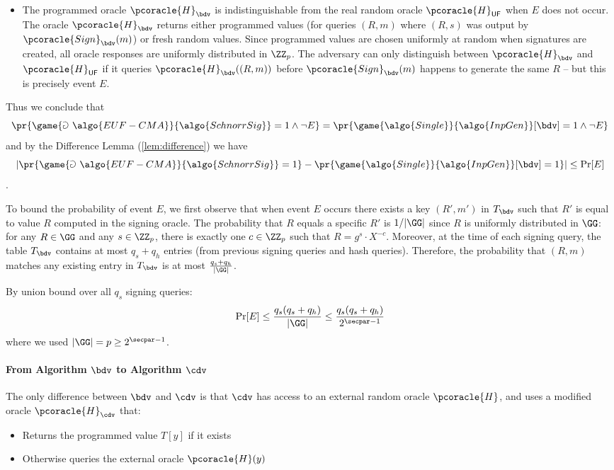 \begin{mysolution}
\begin{itemize}
    Since there's a bijection between the randomness and valid signatures in both cases, and the oracle programming ensures $c = \pcoracle{H}_{\bdv}(R, m)$ when
  queried, both games produce identical signature distributions when $E$ does not occur.
  \item The programmed oracle $\pcoracle{H}_{\bdv}$ is indistinguishable from the real random oracle $\pcoracle{H}_{\mathsf{UF}}$ when $E$ does not occur. The oracle
  $\pcoracle{H}_{\bdv}$ returns either programmed values (for queries $(R, m)$ where $(R, s)$ was output by $\pcoracle{Sign}_{\bdv}(m)$) or fresh random
  values. Since programmed values are chosen uniformly at random when signatures are created, all oracle responses are uniformly
  distributed in $\ZZ_p$. The adversary can only distinguish between $\pcoracle{H}_{\bdv}$ and $\pcoracle{H}_{\mathsf{UF}}$ if it queries $\pcoracle{H}_{\bdv}((R, m))$
  before $\pcoracle{Sign}_{\bdv}(m)$ happens to generate the same $R$ – but this is precisely event $E$.
  \end{itemize}

  Thus we conclude that
  \[
    \pr{\game{\Game~\algo{EUF-CMA}}{\algo{SchnorrSig}} = 1 \wedge \neg E} =  \pr{\game{\algo{Single}}{\algo{InpGen}}[\bdv] = 1 \wedge \neg E}
  \] and by the Difference Lemma (\autoref{lem:difference}) we have
  \[
    |\pr{\game{\Game~\algo{EUF-CMA}}{\algo{SchnorrSig}} = 1} - \pr{\game{\algo{Single}}{\algo{InpGen}}[\bdv] = 1}| \leq \Pr[E]
  \].

  To bound the probability of event $E$, we first observe that when event $E$ occurs there exists a key $(R', m')$ in $T_{\bdv}$ such that $R'$ is equal to value $R$ computed in the signing oracle.
  The probability that $R$ equals a specific $R'$ is $1/|\GG|$ since $R$ is uniformly distributed in $\GG$: for any $R \in \GG$ and any $s \in \ZZ_p$, there is exactly one $c \in \ZZ_p$ such that $R = g^s \cdot X^{-c}$.
  Moreover, at the time of each signing query, the table $T_{\bdv}$ contains at most $q_s + q_h$ entries (from previous signing queries and hash queries).
  Therefore, the probability that $(R, m)$ matches any existing entry in $T_{\bdv}$ is at most $\frac{q_s + q_h}{|\GG|}$.

  By union bound over all $q_s$ signing queries:
  \[
    \Pr[E] \leq \frac{q_s(q_s + q_h)}{|\GG|} \leq \frac{q_s(q_s + q_h)}{2^{\secpar-1}}
  \]
  where we used $|\GG| = p \geq 2^{\secpar-1}$.

  \paragraph{From Algorithm $\bdv$ to Algorithm $\cdv$}
  The only difference between $\bdv$ and $\cdv$ is that $\cdv$ has access to an external random oracle $\pcoracle{H}$, and uses a modified oracle $\pcoracle{H}_{\cdv}$ that:
  \begin{itemize}
    \item Returns the programmed value $T[y]$ if it exists
    \item Otherwise queries the external oracle $\pcoracle{H}(y)$
  \end{itemize}


\end{mysolution}

